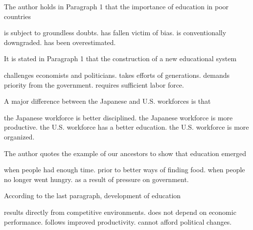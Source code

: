 \item The author holds in Paragraph 1 that the importance of education in poor countries
\begin{tasks}
	\task is subject to groundless doubts.
	\task has fallen victim of bias.
	\task is conventionally downgraded.
	\task has been overestimated.
\end{tasks}
\item It is stated in Paragraph 1 that the construction of a new educational system
\begin{tasks}
	\task challenges economists and politicians.
	\task takes efforts of generations.
	\task demands priority from the government.
	\task requires sufficient labor force.
\end{tasks}
\item A major difference between the Japanese and U.S. workforces is that
\begin{tasks}
	\task the Japanese workforce is better disciplined.
	\task the Japanese workforce is more productive.
	\task the U.S. workforce has a better education.
	\task the U.S. workforce is more organized.
\end{tasks}
\item The author quotes the example of our ancestors to show that education emerged
\begin{tasks}
	\task when people had enough time.
	\task prior to better ways of finding food.
	\task when people no longer went hungry.
	\task as a result of pressure on government.
\end{tasks}
\item According to the last paragraph, development of education
\begin{tasks}
	\task results directly from competitive environments.
	\task does not depend on economic performance.
	\task follows improved productivity.
	\task cannot afford political changes.
\end{tasks}